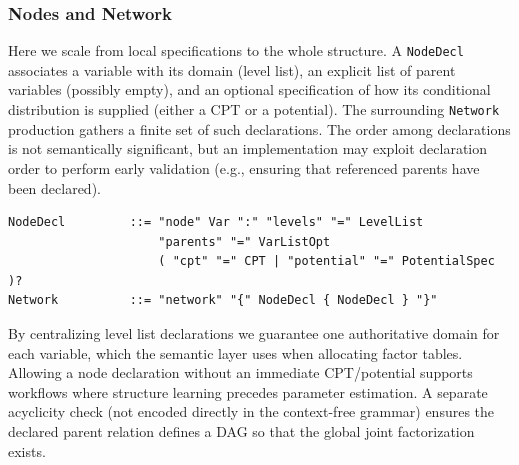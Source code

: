\documentclass[11pt]{article}
\begin{document}
\subsubsection{Nodes and Network}
Here we scale from local specifications to the whole structure. A \texttt{NodeDecl} associates a variable with its domain (level list), an explicit list of parent variables (possibly empty), and an optional specification of how its conditional distribution is supplied (either a CPT or a potential). The surrounding \texttt{Network} production gathers a finite set of such declarations. The order among declarations is not semantically significant, but an implementation may exploit declaration order to perform early validation (e.g., ensuring that referenced parents have been declared).
\begin{lstlisting}[language=EBNF]
NodeDecl         ::= "node" Var ":" "levels" "=" LevelList
					 "parents" "=" VarListOpt
					 ( "cpt" "=" CPT | "potential" "=" PotentialSpec )?
Network          ::= "network" "{" NodeDecl { NodeDecl } "}"
\end{lstlisting}
By centralizing level list declarations we guarantee one authoritative domain for each variable, which the semantic layer uses when allocating factor tables. Allowing a node declaration without an immediate CPT/potential supports workflows where structure learning precedes parameter estimation. A separate acyclicity check (not encoded directly in the context-free grammar) ensures the declared parent relation defines a DAG so that the global joint factorization exists.
\end{document}
